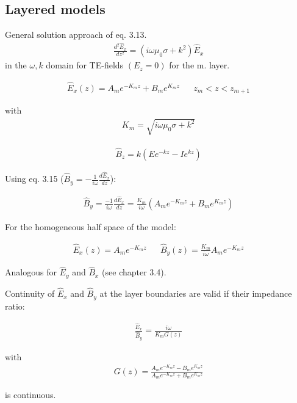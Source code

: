 \subsection{Layered models}
General solution approach of eq. 3.13.
\begin{align*}
\frac{d^2\hat{E}_x}{dz^2}=(i\omega\mu_0\sigma+k^2)\hat{E}_x
\end{align*}
in the $\omega,k$ domain for TE-fields $(E_z=0)$ for the m. layer.

\begin{align*}
\hat{E}_x(z)=A_me^{-K_m z}+B_me^{K_m z}&& z_m<z<z_{m+1}
\end{align*}

with 
\begin{align}
K_m=\sqrt{i\omega\mu_0\sigma+k^2}
\end{align}

\begin{align*}
\hat{B}_z=k(Ee^{-kz}-Ie^{kz})
\end{align*}


Using eq. 3.15 ($\hat{B}_y=-\frac{1}{i\omega}\frac{d\hat{E}_x}{dz}$):

\begin{align}
\hat{B}_y=\frac{-1}{i\omega}\frac{d\hat{E}_x}{dz}=\frac{K_m}{i\omega}(A_me^{-K_m z}+B_me^{K_m z})
\end{align}

For the homogeneous half space of the model:

\begin{align*}
\hat{E}_x(z)=A_me^{-K_m z} && \hat{B}_y(z)=\frac{K_m}{i\omega}A_m e^{-K_m z}
\end{align*}

Analogous for $\hat{E}_y$ and $\hat{B}_x$ (see chapter 3.4).

Continuity of $\hat{E}_x$ and $\hat{B}_y$ at the layer boundaries are valid if their impedance ratio:

\begin{align}
\frac{\hat{E}_x}{\hat{B}_y}=\frac{i\omega}{K_mG(z)}
\end{align}

with 
\begin{align}
G(z)=\frac{A_me^{-K_m z}-B_me^{K_m z}}{A_me^{-K_m z}+B_me^{K_m z}}
\end{align}

is continuous.